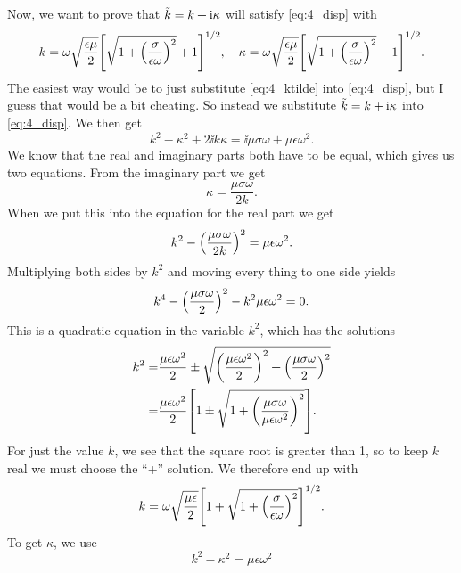 \documentclass[11pt,letter, swedish, english
]{article}
\begin{document}
Now, we want to prove that $\tilde{k}=k+\mathrm{i}\kappa$ will satisfy
\eqref{eq:4_disp} with
\begin{equation}\label{eq:4_ktilde}
k=\omega\sqrt{\frac{\epsilon\mu}{2}}
\qty[\sqrt{1+\qty(\frac{\sigma}{\epsilon\omega})^2}+1]^{1/2}
\qcomma
\kappa=\omega\sqrt{\frac{\epsilon\mu}{2}}
\qty[\sqrt{1+\qty(\frac{\sigma}{\epsilon\omega})^2}-1]^{1/2}.
\end{equation}
The easiest way would be to just substitute \eqref{eq:4_ktilde} into
\eqref{eq:4_disp}, but I guess that would be a bit cheating. So
instead we substitute $\tilde{k}=k+\mathrm{i}\kappa$ into \eqref{eq:4_disp}. We then
get
\begin{equation}
k^2-\kappa^2 + 2\ii k\kappa 
= \ii\mu\sigma\omega +\mu\epsilon\omega^2.
\end{equation}
We know that the real and imaginary parts both have to be equal, which
gives us two equations. From the imaginary part we get
\begin{equation}
\kappa=\frac{\mu\sigma\omega}{2k}.
\end{equation}
When we put this into the equation for the real part we get
\begin{equation}
k^2- \qty(\frac{\mu\sigma\omega}{2k})^2
= \mu\epsilon\omega^2.
\end{equation}
Multiplying both sides by $k^2$ and moving every thing to one side
yields 
\begin{equation}
k^4- \qty(\frac{\mu\sigma\omega}{2})^2
- k^2\mu\epsilon\omega^2 =0.
\end{equation}
This is a quadratic equation in the variable $k^2$, which has the
solutions
\begin{equation}\label{eq:4_k2}
\begin{aligned}
k^2 =& \frac{\mu\epsilon\omega^2}{2}
\pm\sqrt{
\qty(\frac{\mu\epsilon\omega^2}{2})^2 
+ \qty(\frac{\mu\sigma\omega}{2})^2   }\\
=& \frac{\mu\epsilon\omega^2}{2}
\qty[ 1 \pm\sqrt{
1+ \qty(\frac{\mu\sigma\omega}{\mu\epsilon\omega^2})^2
} ].
\end{aligned}
\end{equation}
For just the value $k$, we see that the square root is greater than 1,
so to keep $k$ real we must choose the ``+'' solution. We therefore
end up with
\begin{equation}
k = \omega\sqrt{\frac{\mu\epsilon}{2}}
\qty[ 1 +\sqrt{
1+ \qty(\frac{\sigma}{\epsilon\omega})^2
} ]^{1/2}.
\end{equation}
To get $\kappa$, we use 
\begin{equation}
k^2-\kappa^2 = \mu\epsilon\omega^2
\end{equation}
\end{document}

